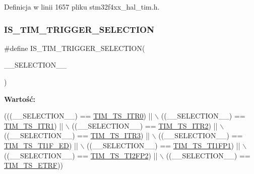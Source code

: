 Definicja w linii 1657 pliku stm32f4xx\+\_\+hal\+\_\+tim.\+h.

\mbox{\label{group___t_i_m___private___macros_ga31d479d785a28d48bd66fdca38b48d91}} 
\subsubsection{\texorpdfstring{I\+S\+\_\+\+T\+I\+M\+\_\+\+T\+R\+I\+G\+G\+E\+R\+\_\+\+S\+E\+L\+E\+C\+T\+I\+ON}{IS\_TIM\_TRIGGER\_SELECTION}}
{\footnotesize\ttfamily \#define I\+S\+\_\+\+T\+I\+M\+\_\+\+T\+R\+I\+G\+G\+E\+R\+\_\+\+S\+E\+L\+E\+C\+T\+I\+ON(\begin{DoxyParamCaption}\item[{}]{\+\_\+\+\_\+\+S\+E\+L\+E\+C\+T\+I\+O\+N\+\_\+\+\_\+ }\end{DoxyParamCaption})}

{\bfseries Wartość\+:}
\begin{DoxyCode}
(((\_\_SELECTION\_\_) == \hyperlink{group___t_i_m___trigger___selection_gab7cf2b7db3956d4fd1e5a5d84f4891e7}{TIM\_TS\_ITR0}) || \(\backslash\)
                                                 ((\_\_SELECTION\_\_) == \hyperlink{group___t_i_m___trigger___selection_gad90fbca297153ca9c0112a67ea2c6cb3}{TIM\_TS\_ITR1}) || \(\backslash\)
                                                 ((\_\_SELECTION\_\_) == \hyperlink{group___t_i_m___trigger___selection_ga8599ba58a5f911d648503c7ac55d4320}{TIM\_TS\_ITR2}) || \(\backslash\)
                                                 ((\_\_SELECTION\_\_) == \hyperlink{group___t_i_m___trigger___selection_ga63183e611b91c5847040172c0069514d}{TIM\_TS\_ITR3}) || \(\backslash\)
                                                 ((\_\_SELECTION\_\_) == 
      \hyperlink{group___t_i_m___trigger___selection_ga8c89554efc693e679c94b5a749af123c}{TIM\_TS\_TI1F\_ED}) || \(\backslash\)
                                                 ((\_\_SELECTION\_\_) == 
      \hyperlink{group___t_i_m___trigger___selection_ga38d3514d54bcdb0ea8ac8bd91c5832b5}{TIM\_TS\_TI1FP1}) || \(\backslash\)
                                                 ((\_\_SELECTION\_\_) == 
      \hyperlink{group___t_i_m___trigger___selection_ga0ed58a269bccd3f22d19cc9a2ba3123f}{TIM\_TS\_TI2FP2}) || \(\backslash\)
                                                 ((\_\_SELECTION\_\_) == \hyperlink{group___t_i_m___trigger___selection_gaece08e02e056613a882aa7ff0a6ccc2d}{TIM\_TS\_ETRF}))
\end{DoxyCode}


